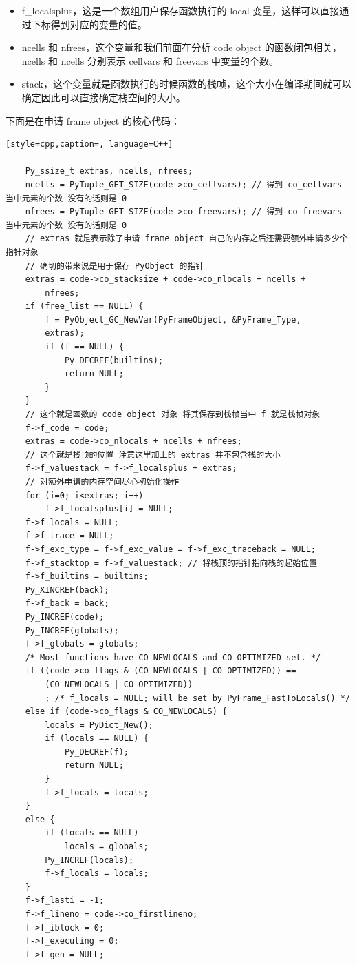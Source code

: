 \begin{itemize}
\item f\_localsplus，这是一个数组用户保存函数执行的 local 变量，这样可以直接通过下标得到对应的变量的值。 
\item ncells 和 nfrees，这个变量和我们前面在分析 code object 的函数闭包相关，ncells 和 ncells 分别表示 cellvars 和 freevars 中变量的个数。 
\item stack，这个变量就是函数执行的时候函数的栈帧，这个大小在编译期间就可以确定因此可以直接确定栈空间的大小。 
\end{itemize}
下面是在申请 frame object 的核心代码：
\begin{lstlisting}[style=cpp,caption=, language=C++]

    Py_ssize_t extras, ncells, nfrees;
    ncells = PyTuple_GET_SIZE(code->co_cellvars); // 得到 co_cellvars 当中元素的个数 没有的话则是 0
    nfrees = PyTuple_GET_SIZE(code->co_freevars); // 得到 co_freevars 当中元素的个数 没有的话则是 0
    // extras 就是表示除了申请 frame object 自己的内存之后还需要额外申请多少个 指针对象
    // 确切的带来说是用于保存 PyObject 的指针
    extras = code->co_stacksize + code->co_nlocals + ncells +
        nfrees;
    if (free_list == NULL) {
        f = PyObject_GC_NewVar(PyFrameObject, &PyFrame_Type,
        extras);
        if (f == NULL) {
            Py_DECREF(builtins);
            return NULL;
        }
    }
    // 这个就是函数的 code object 对象 将其保存到栈帧当中 f 就是栈帧对象
    f->f_code = code;
    extras = code->co_nlocals + ncells + nfrees;
    // 这个就是栈顶的位置 注意这里加上的 extras 并不包含栈的大小
    f->f_valuestack = f->f_localsplus + extras;
    // 对额外申请的内存空间尽心初始化操作
    for (i=0; i<extras; i++)
        f->f_localsplus[i] = NULL;
    f->f_locals = NULL;
    f->f_trace = NULL;
    f->f_exc_type = f->f_exc_value = f->f_exc_traceback = NULL;
    f->f_stacktop = f->f_valuestack; // 将栈顶的指针指向栈的起始位置
    f->f_builtins = builtins;
    Py_XINCREF(back);
    f->f_back = back;
    Py_INCREF(code);
    Py_INCREF(globals);
    f->f_globals = globals;
    /* Most functions have CO_NEWLOCALS and CO_OPTIMIZED set. */
    if ((code->co_flags & (CO_NEWLOCALS | CO_OPTIMIZED)) ==
        (CO_NEWLOCALS | CO_OPTIMIZED))
        ; /* f_locals = NULL; will be set by PyFrame_FastToLocals() */
    else if (code->co_flags & CO_NEWLOCALS) {
        locals = PyDict_New();
        if (locals == NULL) {
            Py_DECREF(f);
            return NULL;
        }
        f->f_locals = locals;
    }
    else {
        if (locals == NULL)
            locals = globals;
        Py_INCREF(locals);
        f->f_locals = locals;
    }
    f->f_lasti = -1;
    f->f_lineno = code->co_firstlineno;
    f->f_iblock = 0;
    f->f_executing = 0;
    f->f_gen = NULL;
\end{lstlisting}
